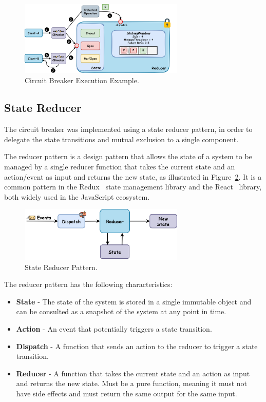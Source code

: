\begin{figure}[H]
    \centering
    \includegraphics[width=0.7\textwidth]{../figures/05_cbreaker-execution-example}
    \caption{Circuit Breaker Execution Example.}
    \label{fig:circuit-breaker-execution-example}
\end{figure}

\subsection{State Reducer}\label{subsec:cbreaker-state-reducer}

The circuit breaker was implemented using a state reducer pattern,
in order to delegate the state transitions and mutual exclusion to a single component.

The reducer pattern is a design pattern
that allows the state of a system
to be managed by a single reducer function
that takes the current state and an action/event as input and returns the new state, as illustrated in Figure~\ref{fig:reducer-pattern}.
It is a common pattern in the Redux~\cite{redux} state management library and the React~\cite{react-use-reducer} library,
both widely used in the JavaScript ecosystem.

\begin{figure}[!htb]
    \centering
    \includegraphics[width=0.7\textwidth]{../figures/05_reducer-pattern}
    \caption{State Reducer Pattern.}
    \label{fig:reducer-pattern}
\end{figure}

The reducer pattern has the following characteristics:

\begin{itemize}
    \item \textbf{State} - The state of the system is stored in a single immutable object and can be consulted as a snapshot of the system at any point in time.
    \item \textbf{Action} - An event that potentially triggers a state transition.
    \item \textbf{Dispatch} - A function that sends an action to the reducer to trigger a state transition.
    \item \textbf{Reducer} - A function that takes the current state and an action as input and returns the new state.
    Must be a pure function, meaning it must not have side effects and must return the same output for the same input.
\end{itemize}

